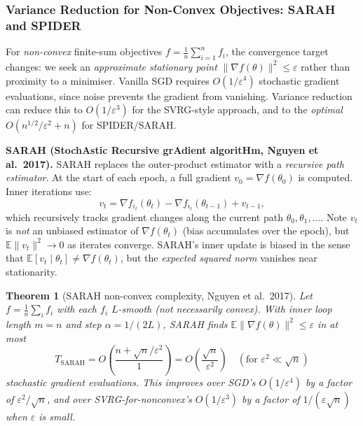 \documentclass[11pt,a4paper]{article}
\newtheorem{theorem}{Theorem}[section]
\theoremstyle{definition}
\begin{document}
\subsubsection{Variance Reduction for Non-Convex Objectives: SARAH and SPIDER}

For \emph{non-convex} finite-sum objectives $f = \frac{1}{n}\sum_{i=1}^n f_i$, the convergence target changes: we seek an \emph{approximate stationary point} $\|\nabla f(\theta)\|^2 \leq \varepsilon$ rather than proximity to a minimiser. Vanilla SGD requires $O(1/\varepsilon^4)$ stochastic gradient evaluations, since noise prevents the gradient from vanishing. Variance reduction can reduce this to $O(1/\varepsilon^3)$ for the SVRG-style approach, and to the \emph{optimal} $O(n^{1/2}/\varepsilon^2 + n)$ for SPIDER/SARAH.

\noindent\textbf{SARAH (StochAstic Recursive grAdient algoritHm, Nguyen et al.\ 2017).} SARAH replaces the outer-product estimator with a \emph{recursive path estimator}. At the start of each epoch, a full gradient $v_0 = \nabla f(\theta_0)$ is computed. Inner iterations use:
\begin{equation}
v_t = \nabla f_{i_t}(\theta_t) - \nabla f_{i_t}(\theta_{t-1}) + v_{t-1},
\label{eq:sarah_update}
\end{equation}
which recursively tracks gradient changes along the current path $\theta_0, \theta_1, \ldots$. Note $v_t$ is \emph{not} an unbiased estimator of $\nabla f(\theta_t)$ (bias accumulates over the epoch), but $\mathbb{E}\|v_t\|^2 \to 0$ as iterates converge. SARAH's inner update is biased in the sense that $\mathbb{E}[v_t \mid \theta_t] \neq \nabla f(\theta_t)$, but the \emph{expected squared norm} vanishes near stationarity.

\begin{theorem}[SARAH non-convex complexity, Nguyen et al.\ 2017]
Let $f = \frac{1}{n}\sum_i f_i$ with each $f_i$ $L$-smooth (not necessarily convex). With inner loop length $m = n$ and step $\alpha = 1/(2L)$, SARAH finds $\mathbb{E}\|\nabla f(\theta)\|^2 \leq \varepsilon$ in at most
\begin{equation}
T_{\text{SARAH}} = O\!\left(\frac{n + \sqrt{n}/\varepsilon^2}{1}\right) = O\!\left(\frac{\sqrt{n}}{\varepsilon^2}\right) \quad (\text{for } \varepsilon^2 \ll \sqrt{n})
\label{eq:sarah_complexity}
\end{equation}
stochastic gradient evaluations. This improves over SGD's $O(1/\varepsilon^4)$ by a factor of $\varepsilon^2/\sqrt{n}$, and over SVRG-for-nonconvex's $O(1/\varepsilon^3)$ by a factor of $1/(\varepsilon \sqrt{n})$ when $\varepsilon$ is small.
\end{theorem}
\end{document}

